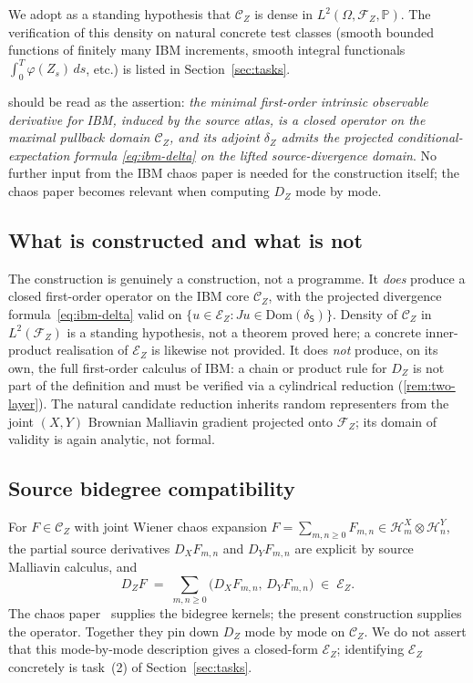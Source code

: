 \documentclass[11pt,reqno]{amsart}
\theoremstyle{plain}
\theoremstyle{definition}
\theoremstyle{remark}
\newcommand{\Prob}{\mathbb{P}}
\newcommand{\Hilb}{\mathcal{H}}
\newcommand{\Dom}{\mathrm{Dom}}
\newcommand{\Energy}{\mathcal{E}}
\newcommand{\Source}{\mathsf{S}}
\newcommand{\IBM}{Z}
\begin{document}
We adopt as a standing hypothesis that $\mathcal C_\IBM$ is dense in
$L^{2}(\Omega,\mathcal F_\IBM,\Prob)$. The verification of this density
on natural concrete test classes (smooth bounded functions of finitely
many IBM increments, smooth integral functionals
$\int_{0}^{T}\varphi(\IBM_{s})\,ds$, etc.) is listed in
Section~\ref{sec:tasks}.

 should be read as the assertion: \emph{the minimal
first-order intrinsic observable derivative for IBM, induced by the
source atlas, is a closed operator on the maximal pullback domain
$\mathcal C_\IBM$, and its adjoint $\delta_\IBM$ admits the projected
conditional-expectation formula \eqref{eq:ibm-delta} on the lifted
source-divergence domain}. No further input from the IBM chaos paper is
needed for the construction itself; the chaos paper becomes relevant
when computing $D_\IBM$ mode by mode.

\subsection*{What is constructed and what is not}

The construction is genuinely a construction, not a programme. It
\emph{does} produce a closed first-order operator on the IBM core
$\mathcal C_\IBM$, with the projected divergence
formula~\eqref{eq:ibm-delta} valid on
$\{u\in\Energy_\IBM:Ju\in\Dom(\delta_\Source)\}$. Density of
$\mathcal C_\IBM$ in $L^{2}(\mathcal F_\IBM)$ is a standing hypothesis,
not a theorem proved here; a concrete inner-product realisation of
$\Energy_\IBM$ is likewise not provided. It does \emph{not} produce,
on its own, the full first-order calculus of IBM: a chain or product
rule for $D_\IBM$ is not part of the definition and must be verified
via a cylindrical reduction (\cref{rem:two-layer}). The natural
candidate reduction inherits random representers from the joint
$(X,Y)$ Brownian Malliavin gradient projected onto $\mathcal F_\IBM$;
its domain of validity is again analytic, not formal.

\subsection*{Source bidegree compatibility}

For $F\in\mathcal C_\IBM$ with joint Wiener chaos expansion
$F=\sum_{m,n\ge 0}F_{m,n}\in\Hilb^{X}_{m}\otimes\Hilb^{Y}_{n}$, the
partial source derivatives $D_X F_{m,n}$ and $D_Y F_{m,n}$ are explicit
by source Malliavin calculus, and
\[
  D_\IBM F \;=\; \sum_{m,n\ge 0}\bigl(D_X F_{m,n},\,D_Y F_{m,n}\bigr)
  \;\in\;\Energy_\IBM.
\]
The chaos paper~\cite{Fontes-IBMchaos} supplies the bidegree kernels;
the present construction supplies the operator. Together they pin down
$D_\IBM$ mode by mode on $\mathcal C_\IBM$. We do not assert that this
mode-by-mode description gives a closed-form $\Energy_\IBM$;
identifying $\Energy_\IBM$ concretely is task~(2) of
Section~\ref{sec:tasks}.
\end{document}
